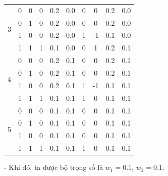 \begin{itemize}
\begin{table}[H]
\begin{tabular}{|c|cc|c|cc|c|c|cc|}
\multirow{4}{*}{3} & \multicolumn{1}{c|}{0} & 0 & 0 & \multicolumn{1}{c|}{0.2} & 0.0 & 0 & 0 & \multicolumn{1}{c|}{0.2} & 0.0 \\ \cline{2-10} 
 & \multicolumn{1}{c|}{0} & 1 & 0 & \multicolumn{1}{c|}{0.2} & 0.0 & 0 & 0 & \multicolumn{1}{c|}{0.2} & 0.0 \\ \cline{2-10} 
 & \multicolumn{1}{c|}{1} & 0 & 0 & \multicolumn{1}{c|}{0.2} & 0.0 & 1 & -1 & \multicolumn{1}{c|}{0.1} & 0.0 \\ \cline{2-10} 
 & \multicolumn{1}{c|}{1} & 1 & 1 & \multicolumn{1}{c|}{0.1} & 0.0 & 0 & 1 & \multicolumn{1}{c|}{0.2} & 0.1 \\ \hline
\multirow{4}{*}{4} & \multicolumn{1}{c|}{0} & 0 & 0 & \multicolumn{1}{c|}{0.2} & 0.1 & 0 & 0 & \multicolumn{1}{c|}{0.2} & 0.1 \\ \cline{2-10} 
 & \multicolumn{1}{c|}{0} & 1 & 0 & \multicolumn{1}{c|}{0.2} & 0.1 & 0 & 0 & \multicolumn{1}{c|}{0.2} & 0.1 \\ \cline{2-10} 
 & \multicolumn{1}{c|}{1} & 0 & 0 & \multicolumn{1}{c|}{0.2} & 0.1 & 1 & -1 & \multicolumn{1}{c|}{0.1} & 0.1 \\ \cline{2-10} 
 & \multicolumn{1}{c|}{1} & 1 & 1 & \multicolumn{1}{c|}{0.1} & 0.1 & 1 & 0 & \multicolumn{1}{c|}{0.1} & 0.1 \\ \hline
\multirow{4}{*}{5} & \multicolumn{1}{c|}{0} & 0 & 0 & \multicolumn{1}{c|}{0.1} & 0.1 & 0 & 0 & \multicolumn{1}{c|}{0.1} & 0.1 \\ \cline{2-10} 
 & \multicolumn{1}{c|}{0} & 1 & 0 & \multicolumn{1}{c|}{0.1} & 0.1 & 0 & 0 & \multicolumn{1}{c|}{0.1} & 0.1 \\ \cline{2-10} 
 & \multicolumn{1}{c|}{1} & 0 & 0 & \multicolumn{1}{c|}{0.1} & 0.1 & 0 & 0 & \multicolumn{1}{c|}{0.1} & 0.1 \\ \cline{2-10} 
 & \multicolumn{1}{c|}{1} & 1 & 1 & \multicolumn{1}{c|}{0.1} & 0.1 & 1 & 0 & \multicolumn{1}{c|}{0.1} & 0.1 \\ \hline
\end{tabular}
\end{table}
- Khi đó, ta được bộ trọng số là $w_{1} = 0.1$, $w_{2} = 0.1$. 

\end{itemize}

